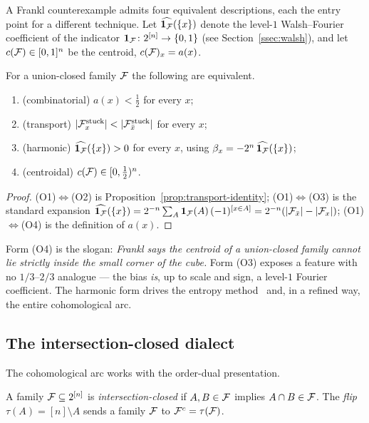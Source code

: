 A Frankl counterexample admits four equivalent descriptions, each the
entry point for a different technique. Let $\widehat{\mathbf
1_{\mathcal{F}}}(\{x\})$ denote the level-$1$ Walsh--Fourier coefficient of the
indicator $\mathbf1_{\mathcal{F}}\colon2^{[n]}\to\{0,1\}$ (see
Section~\ref{ssec:walsh}), and let $c(\mathcal{F})\in[0,1]^n$ be the centroid,
$c(\mathcal{F})_x=a(x)$.

\begin{proposition}
\label{prop:four-forms}
For a union-closed family $\mathcal{F}$ the following are equivalent.
\begin{enumerate}[label=\textup{(O\arabic*)},leftmargin=3em]
\item \textup{(combinatorial)} $a(x)<\tfrac12$ for every $x$;
\item \textup{(transport)}
  $|\F^{\stuck}_x|<|\F^{\stuck}_{\bar x}|$ for every $x$;
\item \textup{(harmonic)}
  $\widehat{\mathbf1_{\mathcal{F}}}(\{x\})>0$ for every $x$, using
  $\beta_x=-2^n\,\widehat{\mathbf1_{\mathcal{F}}}(\{x\})$;
\item \textup{(centroidal)} $c(\mathcal{F})\in[0,\tfrac12)^n$.
\end{enumerate}
\end{proposition}

\begin{proof}
(O1)$\Leftrightarrow$(O2) is Proposition~\ref{prop:transport-identity};
(O1)$\Leftrightarrow$(O3) is the standard expansion
$\widehat{\mathbf1_{\mathcal{F}}}(\{x\})=2^{-n}\sum_A\mathbf1_{\mathcal{F}}(A)\,(-1)^{[x\in
A]}=2^{-n}(|\mathcal{F}_{\bar x}|-|\mathcal{F}_x|)$; (O1)$\Leftrightarrow$(O4) is the
definition of $a(x)$.
\end{proof}

Form (O4) is the slogan: \emph{Frankl says the centroid of a
union-closed family cannot lie strictly inside the small corner of the
cube.} Form (O3) exposes a feature with no $1/3$--$2/3$ analogue --- the
bias \emph{is}, up to scale and sign, a level-$1$ Fourier coefficient.
The harmonic form drives the entropy method~\cite{gilmer,sawin} and,
in a refined way, the entire cohomological arc.

\subsection{The intersection-closed dialect}
\label{ssec:flip}

The cohomological arc works with the order-dual presentation.

\begin{definition}
\label{def:int-closed}
A family $\mathcal{F}\subseteq2^{[n]}$ is \emph{intersection-closed} if
$A,B\in\mathcal{F}$ implies $A\cap B\in\mathcal{F}$. The \emph{flip}
$\tau(A)=[n]\setminus A$ sends a family $\mathcal{F}$ to $\mathcal{F}^c=\tau(\mathcal{F})$.
\end{definition}

